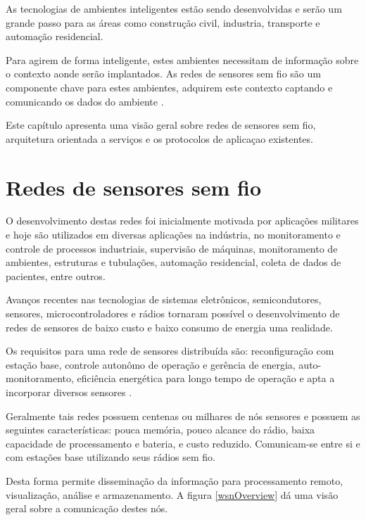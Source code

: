 As tecnologias de ambientes inteligentes est\~ao sendo desenvolvidas e ser\~ao um grande passo para as \'areas como constru\c{c}\~ao civil, industria, transporte e automa\c{c}\~ao residencial.

Para agirem de forma inteligente, estes ambientes necessitam de informa\c{c}\~ao sobre o contexto aonde ser\~ao implantados. As redes de sensores sem fio s\~ao um componente chave para estes ambientes, adquirem este contexto captando e comunicando os dados do ambiente \cite{lewis2004wireless}.

Este cap\'itulo apresenta uma vis\~ao geral sobre redes de sensores sem fio, arquitetura orientada a servi\c{c}os e os protocolos de aplica\c{c}ao existentes.

\section{Redes de sensores sem fio}

O desenvolvimento destas redes foi inicialmente motivada por aplica\c{c}\~oes militares e hoje s\~ao utilizados em diversas aplica\c{c}\~oes na ind\'ustria, no monitoramento e controle de processos industriais, supervis\~ao de m\'aquinas, monitoramento de ambientes, estruturas e tubula\c{c}\~oes, automa\c{c}\~ao residencial, coleta de dados de pacientes, entre outros.

Avan\c{c}os recentes nas tecnologias de sistemas eletr\^onicos, semicondutores, sensores, microcontroladores e r\'adios tornaram poss\'ivel o desenvolvimento de redes de sensores de baixo custo e baixo consumo de energia uma realidade.

Os requisitos para uma rede de sensores distribu\'ida s\~ao: reconfigura\c{c}\~ao com esta\c{c}\~ao base, controle auton\^omo de opera\c{c}\~ao e ger\^encia de energia, auto-monitoramento, efici\^encia energ\'etica para longo tempo de opera\c{c}\~ao e apta a incorporar diversos sensores \cite{542724}.

Geralmente tais redes possuem centenas ou milhares de n\'os sensores e possuem as seguintes caracter\'isticas: pouca mem\'oria, pouco alcance do r\'adio, baixa capacidade de processamento e bateria, e custo reduzido. Comunicam-se entre si e com esta\c{c}\~oes base utilizando seus r\'adios sem fio.

Desta forma permite dissemina\c{c}\~ao da informa\c{c}\~ao para processamento remoto, visualiza\c{c}\~ao, an\'alise e armazenamento. A figura \ref{wsnOverview} d\'a uma vis\~ao geral sobre a comunica\c{c}\~ao destes n\'os.

